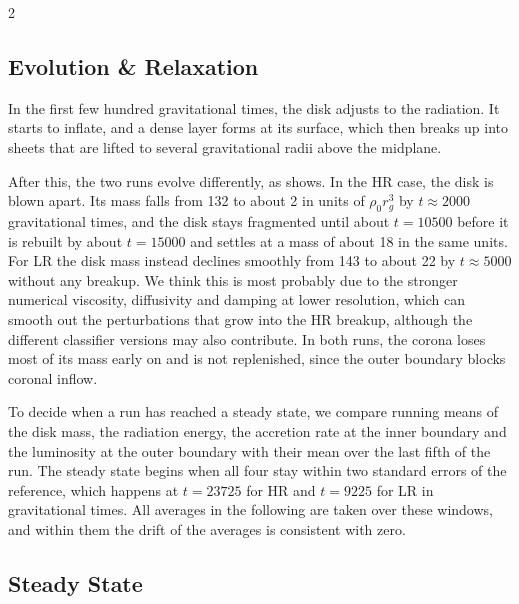 \begin{multicols}{2}
	\subsection{Evolution \& Relaxation}

	In the first few hundred gravitational times, the disk adjusts to the radiation. It starts to inflate, and a dense layer forms at its
	surface, which then breaks up into sheets that are lifted to several gravitational radii above the midplane.

	After this, the two runs evolve differently, as  shows. In the HR case, the disk is blown apart. Its mass falls
	from \num{132} to about \num{2} in units of $\rho_0 r_g^3$ by $t \approx 2000$ gravitational times, and the disk stays
	fragmented until about $t = 10500$ before it is rebuilt by about $t = 15000$ and settles at a mass of about \num{18} in the
	same units. For LR the disk mass instead declines smoothly from \num{143} to about \num{22} by $t \approx 5000$ without any
	breakup. We think this is most probably due to the stronger numerical viscosity, diffusivity and damping at lower resolution,
	which can smooth out the perturbations that grow into the HR breakup, although the different classifier versions may also
	contribute. In both runs, the corona loses most of its mass early on and is not replenished, since the outer boundary blocks
	coronal inflow.


	To decide when a run has reached a steady state, we compare running means of the disk mass, the radiation energy, the
	accretion rate at the inner boundary and the luminosity at the outer boundary with their mean over the last fifth of the run.
	The steady state begins when all four stay within two standard errors of the reference, which happens at $t = 23725$ for HR
	and $t = 9225$ for LR in gravitational times. All averages in the following are taken over these windows, and within them
	the drift of the averages is consistent with zero.

	\vspace{-0.5ex}

	\subsection{Steady State}


\end{multicols}
